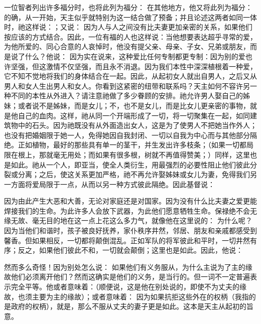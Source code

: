 一位智者列出许多福分时，也将此列为福分： 在其他地方，他又将此列为福分： 的确，从一开始，天主似乎就特别为这一结合做了预备；并且论述这两者如同一体时，祂这样说：；又说： 因为人与人之间没有比夫妻更加亲密的关系，如果他们按应该的方式结合。因此，一位有福的人也这样说：当他想要表达超乎寻常的爱，为他所爱的、同心合意的人哀悼时，他没有提父亲、母亲、子女、兄弟或朋友，而是说了什么？他说： 因为实在说来，这种爱比任何专制都更专制：因为别的爱也许坚强，但这激情不仅坚强，而且永不消退。因为我们本性中深深植根着一种爱，它不知不觉地将我们的身体结合在一起。因此，从起初女人就出自男人，之后又从男人和女人生出男人和女人。你看到这紧密的纽带和联系吗？天主如何不容许另一种不同的本性从外进入？请注意祂做了多少眷顾的安排。祂允许男人娶自己的姊妹；或者说不是姊妹，而是女儿；不，也不是女儿，而是比女儿更亲密的事物，就是他自己的血肉。这样，祂从同一个开端形成了一切，将一切聚集在一起，如同建筑物中的石头。因为祂既没有从外面造出女人，这是为了使男人不把她当作外人；也没有把婚姻限于她一人，免得她因自我封闭、一切以自我为中心而与其他部分隔绝。正如植物，最好的那些具有单一的茎干，并生发出许多枝条；（如果一切都局限在根上，那就毫无用处；而如果有很多根，树就不再值得赞美；）同样，这里也是如此。祂从一个人，即亚当，使全人类衍生，用最强烈的必要性阻止他们彼此分裂或分离；之后，使这关系更加严格，祂不再允许娶姊妹或女儿为妻，免得我们另一方面将爱局限于一点，从而以另一种方式彼此隔绝。因此基督说：\par

因为由此产生大恶和大善，无论对家庭还是对国家。因为没有什么比夫妻之爱更能焊接我们的生命。为此许多人会放下武器，为此他们愿意牺牲生命。保禄绝不会无缘无故、毫无目的地在这一点上花这么多力气，就像他在这里说的： 为什么呢？因为当他们和谐时，孩子被良好抚养，家仆秩序井然，邻居、朋友和亲戚都感受到馨香。但如果相反，一切都将颠倒混乱。正如军队的将军彼此和平时，一切井然有序；反之，如果他们彼此不和，一切就会颠倒；这里也是如此。因此，他说：\par

然而多么奇怪！因为别处怎么说： 如果他们有义务服从，为什么主说为了主的缘故他们必须离开他们？然而这确实是他们的义务，是当行的。但一词不一定普遍表示完全平等。他或者意味着：（顺便说，这是他在别处说的，即使不为丈夫的缘故，也须主要为主的缘故）；或者意味着： 因为如果抗拒这些外在的权柄（我指的是政府的权柄），就是，那么不服从丈夫的妻子更是如此。这本是天主从起初的旨意。\par

